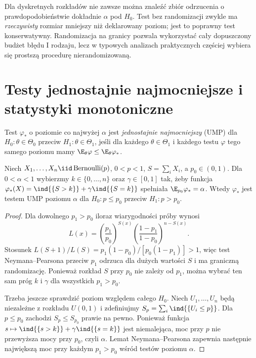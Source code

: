 \begin{uwaga}
Dla dyskretnych rozkładów nie zawsze można znaleźć zbiór
odrzucenia o prawdopodobieństwie dokładnie $\alpha$ pod $H_0$.
Test bez randomizacji zwykle ma \emph{rzeczywisty} rozmiar
mniejszy niż deklarowany poziom; jest to poprawny test
konserwatywny. Randomizacja na granicy pozwala wykorzystać
cały dopuszczony budżet błędu I rodzaju, lecz w typowych analizach
praktycznych częściej wybiera się prostszą procedurę
nierandomizowaną.
\end{uwaga}

\section{Testy jednostajnie najmocniejsze i statystyki monotoniczne}
\begin{definicja}
Test $\varphi_*$ o poziomie co najwyżej $\alpha$ jest
\emph{jednostajnie najmocniejszy} (UMP) dla
$H_0:\theta\in\Theta_0$ przeciw $H_1:\theta\in\Theta_1$,
jeśli dla każdego $\theta\in\Theta_1$ i każdego testu
$\varphi$ tego samego poziomu mamy
$\E_\theta\varphi\le\E_\theta\varphi_*$.
\end{definicja}

\begin{twierdzenie}
\label{thm:binomial-ump}
Niech $X_1,\ldots,X_n\iid\operatorname{Bernoulli}(p)$,
$0<p<1$, $S=\sum_iX_i$, a $p_0\in(0,1)$.
Dla $0<\alpha<1$ wybierzmy $k\in\{0,\ldots,n\}$ oraz
$\gamma\in[0,1]$ tak, żeby funkcja
$\varphi_*(X)=\ind{\{S>k\}}+\gamma\ind{\{S=k\}}$
spełniała $\E_{p_0}\varphi_*=\alpha$.
Wtedy $\varphi_*$ jest testem UMP poziomu $\alpha$ dla
$H_0:p\le p_0$ przeciw $H_1:p>p_0$.
\end{twierdzenie}
\begin{proof}
Dla dowolnego $p_1>p_0$ iloraz wiarygodności próby wynosi
\[
 L(x)=\left(\frac{p_1}{p_0}\right)^{S(x)}
 \left(\frac{1-p_1}{1-p_0}\right)^{n-S(x)}.
\]
Stosunek $L(S+1)/L(S)=p_1(1-p_0)/[p_0(1-p_1)]>1$,
więc test Neymana--Pearsona przeciw $p_1$ odrzuca dla
dużych wartości $S$ i ma graniczną randomizację.
Ponieważ rozkład $S$ przy $p_0$ nie zależy od $p_1$,
można wybrać ten sam próg $k$ i $\gamma$ dla wszystkich
$p_1>p_0$.

Trzeba jeszcze sprawdzić poziom względem całego $H_0$.
Niech $U_1,\ldots,U_n$ będą niezależne z rozkładu
$U(0,1)$ i zdefiniujmy $S_p=\sum_i\ind{\{U_i\le p\}}$.
Dla $p\le p_0$ zachodzi $S_p\le S_{p_0}$ prawie na pewno.
Ponieważ funkcja $s\mapsto\ind{\{s>k\}}+
\gamma\ind{\{s=k\}}$ jest niemalejąca, moc przy $p$
nie przewyższa mocy przy $p_0$, czyli $\alpha$.
Lemat Neymana--Pearsona zapewnia następnie największą moc
przy każdym $p_1>p_0$ wśród testów poziomu $\alpha$.
\end{proof}

